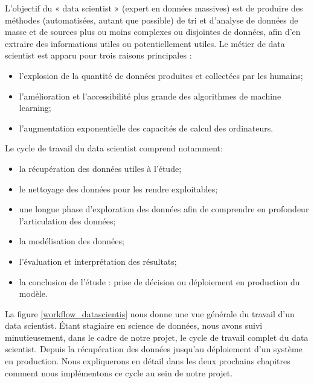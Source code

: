 \documentclass[12pt, french]{report}
\begin{document}
L'objectif du « data scientist » (expert en données massives) est de produire des méthodes (automatisées, autant que possible) de tri et d'analyse de données de masse et de sources plus ou moins complexes ou disjointes de données, afin d'en extraire des informations utiles ou potentiellement utiles. 
Le métier de data scientist est apparu pour trois raisons principales \cite{key6} :	
\begin{itemize}
\item l'explosion de la quantité de données produites et collectées par les humains;
\item 	l'amélioration et l'accessibilité plus grande des algorithmes de machine learning;
\item l'augmentation exponentielle des capacités de calcul des ordinateurs.\\
\end{itemize}	
Le cycle de travail du data scientist comprend notamment:
\begin{itemize}
\item la récupération des données utiles à l'étude;
\item le nettoyage des données pour les rendre exploitables;
\item une longue phase d'exploration des données afin de comprendre en profondeur l'articulation des données;
\item la modélisation des données;
\item l'évaluation et interprétation des résultats;
\item  la conclusion de l'étude : prise de décision ou déploiement en production du modèle.
\end{itemize}
La figure \ref{workflow_datascientis}  nous donne une vue générale du travail d'un data scientist. Étant stagiaire en science de données, nous avons suivi minutieusement, dans le cadre de notre projet, le cycle de travail complet du data scientist. Depuis la récupération des données jusqu'au déploiement d'un système en production. Nous expliquerons en détail dans les deux prochains chapitres comment nous implémentons ce cycle au sein de notre projet. \\ \\
\end{document}
